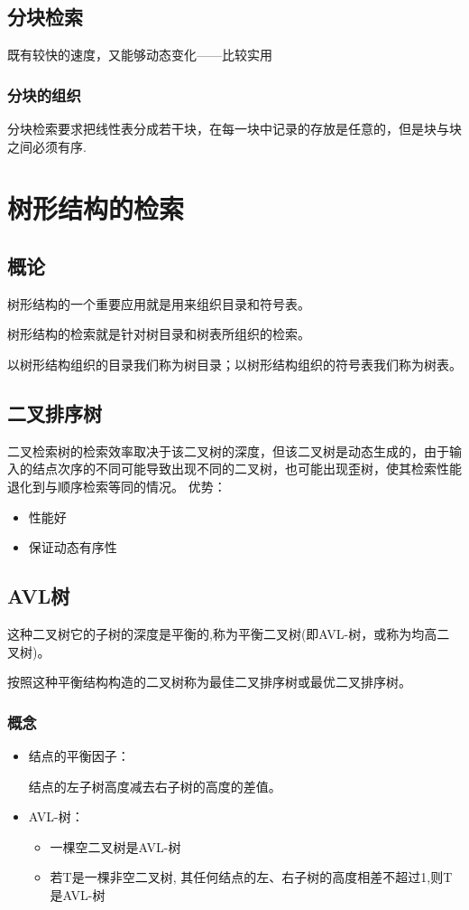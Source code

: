 \documentclass[AutoFakeBold]{LZUThesis2007}
\begin{document}
		\subsection{分块检索}
既有较快的速度，又能够动态变化——比较实用
			\subsubsection{分块的组织}
分块检索要求把线性表分成若干块，在每一块中记录的存放是任意的，但是块与块之间必须有序.
	

	\section{树形结构的检索}
		\subsection{概论}
		树形结构的一个重要应用就是用来组织目录和符号表。

		树形结构的检索就是针对树目录和树表所组织的检索。

		以树形结构组织的目录我们称为树目录；以树形结构组织的符号表我们称为树表。
		 \subsection{二叉排序树} 
		 二叉检索树的检索效率取决于该二叉树的深度，但该二叉树是动态生成的，由于输入的结点次序的不同可能导致出现不同的二叉树，也可能出现歪树，使其检索性能退化到与顺序检索等同的情况。
		 优势：
		 \begin{itemize}
			\item 性能好
			\item 保证动态有序性
		\end{itemize}
		\subsection{AVL树} 
		这种二叉树它的子树的深度是平衡的,称为平衡二叉树(即AVL-树，或称为均高二叉树)。
		
		按照这种平衡结构构造的二叉树称为最佳二叉排序树或最优二叉排序树。

			\subsubsection{概念} 
				\begin{itemize}
					\item 结点的平衡因子：
					
					结点的左子树高度减去右子树的高度的差值。
					\item AVL-树：
						\begin{itemize}
							\item 一棵空二叉树是AVL-树
							\item 若T是一棵非空二叉树, 其任何结点的左、右子树的高度相差不超过1,则T是AVL-树
						\end{itemize}
				\end{itemize}			
\end{document}
